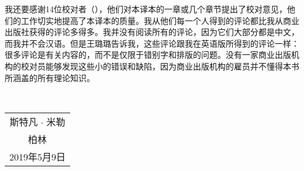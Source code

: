 我还要感谢14位校对者（\makeatletter\@proofreader\makeatother），他们对本译本的一章或几个章节提出了校对意见，他们的工作切实地提高了本译本的质量。我从他们每一个人得到的评论都比我从商业出版社获得的评论多得多。我并没有阅读所有的评论，因为它们大部分都是中文，而我并不会汉语。但是王璐璐告诉我，这些评论跟我在英语版所得到的评论一样：很多评论是有关内容的，而不是仅限于错别字和排版的问题。没有一家商业出版机构的校对员能够发现这些小的错误和缺陷，因为商业出版机构的雇员并不懂得本书所涵盖的所有理论知识。

~\medskip

\noindent
\begin{flushright}
\begin{tabular}{c}
斯特凡 $\cdot$ 米勒\\
柏林\\
2019年5月9日\\
\end{tabular}
\end{flushright}

